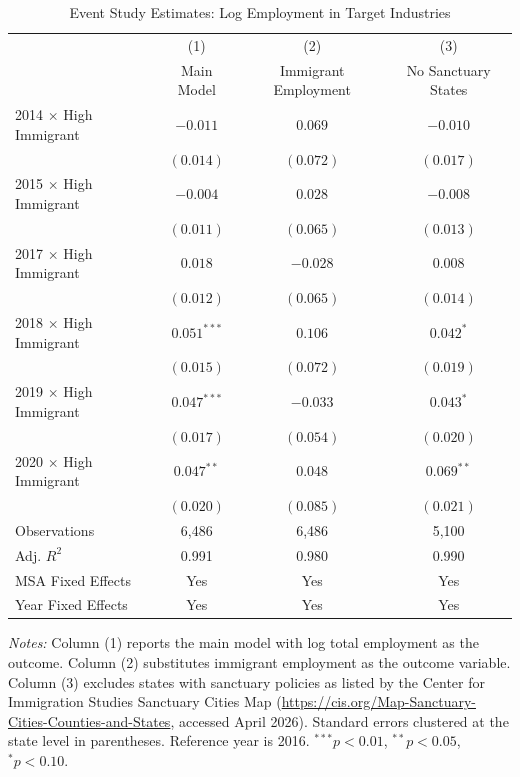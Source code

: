\documentclass[12pt]{article}
\begin{document}
\begin{table}[h]
\centering
\caption{Event Study Estimates: Log Employment in Target Industries}
\begin{tabular}{lccc}
\hline\hline
 & (1) & (2) & (3) \\
 & Main Model & Immigrant Employment & No Sanctuary States \\
\hline
2014 $\times$ High Immigrant & $-0.011$ & $0.069$ & $-0.010$ \\
 & $(0.014)$ & $(0.072)$ & $(0.017)$ \\
2015 $\times$ High Immigrant & $-0.004$ & $0.028$ & $-0.008$ \\
 & $(0.011)$ & $(0.065)$ & $(0.013)$ \\
2017 $\times$ High Immigrant & $0.018$ & $-0.028$ & $0.008$ \\
 & $(0.012)$ & $(0.065)$ & $(0.014)$ \\
2018 $\times$ High Immigrant & $0.051^{***}$ & $0.106$ & $0.042^{*}$ \\
 & $(0.015)$ & $(0.072)$ & $(0.019)$ \\
2019 $\times$ High Immigrant & $0.047^{***}$ & $-0.033$ & $0.043^{*}$ \\
 & $(0.017)$ & $(0.054)$ & $(0.020)$ \\
2020 $\times$ High Immigrant & $0.047^{**}$ & $0.048$ & $0.069^{**}$ \\
 & $(0.020)$ & $(0.085)$ & $(0.021)$ \\
\hline
Observations & 6,486 & 6,486 & 5,100 \\
Adj. $R^2$ & 0.991 & 0.980 & 0.990 \\
MSA Fixed Effects & Yes & Yes & Yes \\
Year Fixed Effects & Yes & Yes & Yes \\
\hline\hline
\end{tabular}
\begin{minipage}{0.85\textwidth}
\vspace{6pt}
\small\textit{Notes:} Column (1) reports the main model with log total employment as the outcome. Column (2) substitutes immigrant employment as the outcome variable. Column (3) excludes states with sanctuary policies as listed by the Center for Immigration Studies Sanctuary Cities Map (\url{https://cis.org/Map-Sanctuary-Cities-Counties-and-States}, accessed April 2026). Standard errors clustered at the state level in parentheses. Reference year is 2016. $^{***}p<0.01$, $^{**}p<0.05$, $^{*}p<0.10$.
\end{minipage}
\end{table}
\end{document}

